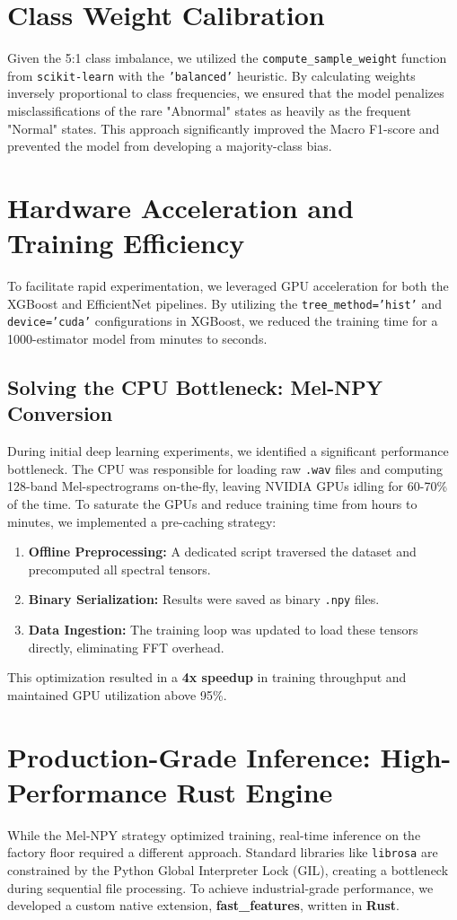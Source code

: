 \section{Class Weight Calibration}
Given the 5:1 class imbalance, we utilized the \texttt{compute\_sample\_weight} function from \texttt{scikit-learn} with the \texttt{'balanced'} heuristic. By calculating weights inversely proportional to class frequencies, we ensured that the model penalizes misclassifications of the rare "Abnormal" states as heavily as the frequent "Normal" states. This approach significantly improved the Macro F1-score and prevented the model from developing a majority-class bias.

\section{Hardware Acceleration and Training Efficiency}
To facilitate rapid experimentation, we leveraged GPU acceleration for both the XGBoost and EfficientNet pipelines. By utilizing the \texttt{tree\_method='hist'} and \texttt{device='cuda'} configurations in XGBoost, we reduced the training time for a 1000-estimator model from minutes to seconds.

\subsection{Solving the CPU Bottleneck: Mel-NPY Conversion}
During initial deep learning experiments, we identified a significant performance bottleneck. The CPU was responsible for loading raw \texttt{.wav} files and computing 128-band Mel-spectrograms on-the-fly, leaving NVIDIA GPUs idling for 60-70\% of the time. To saturate the GPUs and reduce training time from hours to minutes, we implemented a pre-caching strategy:
\begin{enumerate}
    \item \textbf{Offline Preprocessing:} A dedicated script traversed the dataset and precomputed all spectral tensors.
    \item \textbf{Binary Serialization:} Results were saved as binary \texttt{.npy} files.
    \item \textbf{Data Ingestion:} The training loop was updated to load these tensors directly, eliminating FFT overhead.
\end{enumerate}
This optimization resulted in a \textbf{4x speedup} in training throughput and maintained GPU utilization above 95\%.

\section{Production-Grade Inference: High-Performance Rust Engine}
While the Mel-NPY strategy optimized training, real-time inference on the factory floor required a different approach. Standard libraries like \texttt{librosa} are constrained by the Python Global Interpreter Lock (GIL), creating a bottleneck during sequential file processing. To achieve industrial-grade performance, we developed a custom native extension, \textbf{fast\_features}, written in \textbf{Rust}. 


